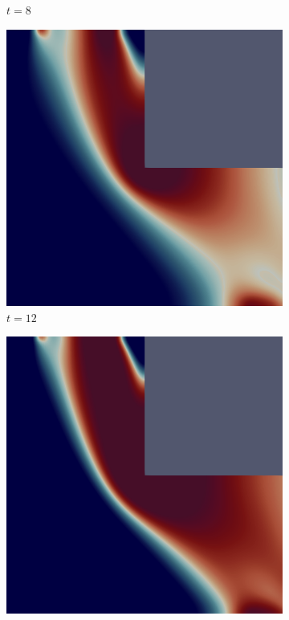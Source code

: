 \begin{figure}[H]
\begin{subfigure}{.4\textwidth}
        \caption{$t = 8$}
    \end{subfigure}
    \begin{subfigure}{.4\textwidth}
        \includegraphics[width=\textwidth]{imgs/LShapeSource/third.png}
        \caption{$t = 12$}
    \end{subfigure}
    \begin{subfigure}{.4\textwidth}
        \includegraphics[width=\textwidth]{imgs/LShapeSource/fourth.png}

\end{subfigure}
\end{figure}
